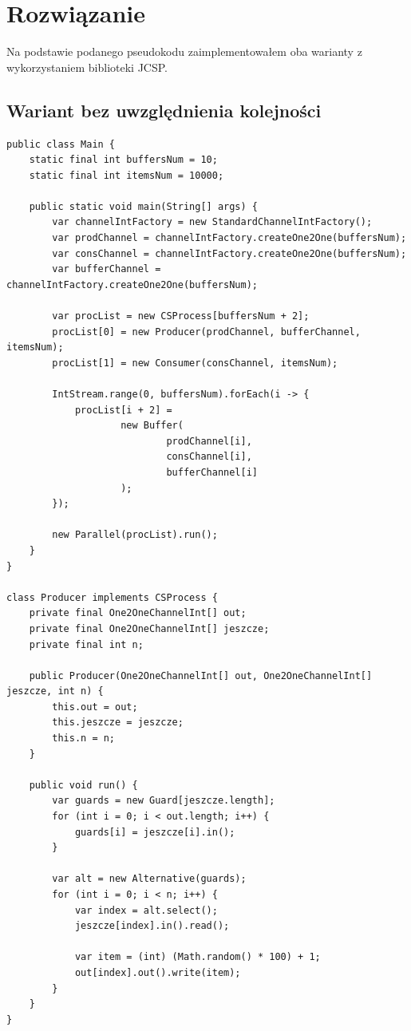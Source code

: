 \documentclass[12pt]{article}
\begin{document}
\section{Rozwiązanie}
Na podstawie podanego pseudokodu zaimplementowałem oba warianty z wykorzystaniem biblioteki JCSP.
\subsection{Wariant bez uwzględnienia kolejności}
\begin{verbatim}
public class Main {
    static final int buffersNum = 10;
    static final int itemsNum = 10000;

    public static void main(String[] args) {
        var channelIntFactory = new StandardChannelIntFactory();
        var prodChannel = channelIntFactory.createOne2One(buffersNum);
        var consChannel = channelIntFactory.createOne2One(buffersNum);
        var bufferChannel = channelIntFactory.createOne2One(buffersNum);

        var procList = new CSProcess[buffersNum + 2];
        procList[0] = new Producer(prodChannel, bufferChannel, itemsNum);
        procList[1] = new Consumer(consChannel, itemsNum);

        IntStream.range(0, buffersNum).forEach(i -> {
            procList[i + 2] =
                    new Buffer(
                            prodChannel[i],
                            consChannel[i],
                            bufferChannel[i]
                    );
        });

        new Parallel(procList).run();
    }
}

class Producer implements CSProcess {
    private final One2OneChannelInt[] out;
    private final One2OneChannelInt[] jeszcze;
    private final int n;

    public Producer(One2OneChannelInt[] out, One2OneChannelInt[] jeszcze, int n) {
        this.out = out;
        this.jeszcze = jeszcze;
        this.n = n;
    }

    public void run() {
        var guards = new Guard[jeszcze.length];
        for (int i = 0; i < out.length; i++) {
            guards[i] = jeszcze[i].in();
        }

        var alt = new Alternative(guards);
        for (int i = 0; i < n; i++) {
            var index = alt.select();
            jeszcze[index].in().read();

            var item = (int) (Math.random() * 100) + 1;
            out[index].out().write(item);
        }
    }
}


\end{verbatim}
\end{document}
